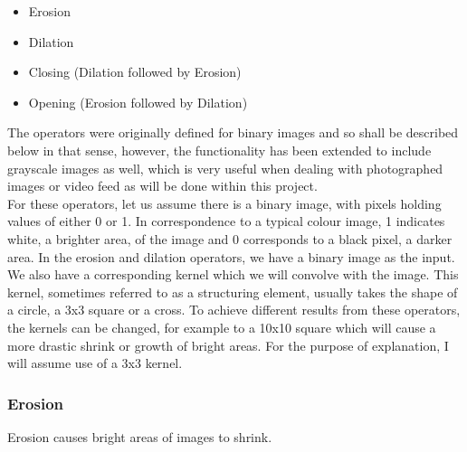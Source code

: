 \documentclass[11pt]{article}
\begin{document}
\begin{itemize}
	\item Erosion	
	\item Dilation
	\item Closing (Dilation followed by Erosion)
	\item Opening (Erosion followed by Dilation)
\end{itemize}

The operators were originally defined for binary images and so shall be 
described below in that sense, however, the functionality has been extended
to include grayscale images as well, which is very useful when dealing with
photographed images or video feed as will be done within this project.
\\
For these operators, let us assume there is a binary image, with pixels 
holding values of either 0 or 1. In correspondence to a typical colour image,
1 indicates white, a brighter area, of the image and 0 corresponds to a
black pixel, a darker area. In the erosion and dilation operators,
we have a binary image as the input. 
We also have a corresponding kernel which we will convolve
with the image. This kernel, sometimes referred to as a structuring element,
usually takes the shape of a circle, a 3x3 square or a cross. To achieve
different results from these operators, the kernels can be changed, for example
to a 10x10 square which will cause a more drastic shrink or growth of bright 
areas. For the purpose of explanation, I will assume use of a 3x3 kernel.

\subsubsection{Erosion}
\begin{center}
Erosion causes bright areas of images to shrink.
\end{center}
\end{document}
